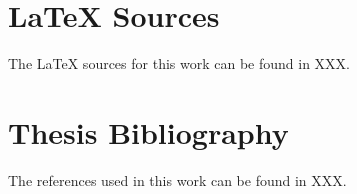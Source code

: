
\begin{appendices}

  \section{{\LaTeX} Sources}
  \label{appendix:latex_sources}
  The {\LaTeX} sources for this work can be found in XXX.

  \section{Thesis Bibliography}
  \label{appendix:thesis_bibliography}
  The references used in this work can be found in XXX.

\end{appendices}
